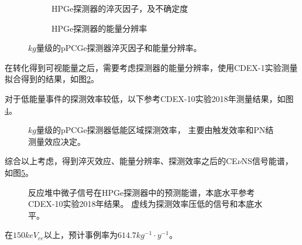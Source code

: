 \begin{figure}
  \begin{subfigure}{.5\textwidth}
    \centering
    
    \caption{\label{fig:ge_quenching_factor} HPGe探测器的淬灭因子，及不确定度\cite{zhao_search_2016}}
  \end{subfigure}
  \begin{subfigure}{.5\textwidth}
    \centering
    
    \caption{\label{fig:ge_resolution} HPGe探测器的能量分辨率}
  \end{subfigure}
  \caption{\label{fig:ge_qf_reso} $\si{kg}$量级的pPCGe探测器淬灭因子和能量分辨率。}
\end{figure}

在转化得到可视能量之后，需要考虑探测器的能量分辨率，使用CDEX-1实验测量拟合得到的结果，如图\ref{fig:ge_resolution}。

对于低能量事件的探测效率较低，以下参考CDEX-10实验2018年测量结果\cite{jiang_limits_2018}，如图\ref{fig:ge_efficiency}。

\begin{figure}
  \centering
  
  \caption{\label{fig:ge_efficiency} $\si{kg}$量级的pPCGe探测器低能区域探测效率\cite{jiang_limits_2018}，
  主要由触发效率和PN结测量效应决定。}
\end{figure}

综合以上考虑，得到淬灭效应、能量分辨率、探测效率之后的CE$\nu$NS信号能谱，如图\ref{fig:event_smear_Ge_rate_prediction}。

\begin{figure}
  \centering
  
  \caption{\label{fig:event_smear_Ge_rate_prediction} 
  反应堆中微子信号在HPGe探测器中的预测能谱，本底水平参考CDEX-10实验2018年结果\cite{jiang_limits_2018}。
  虚线为探测效率压低的信号和本底水平。}
\end{figure}

在$150\si{keV_{ee}}$以上，预计事例率为$614.7\si{kg^{-1}\cdot y^{-1}}$。
